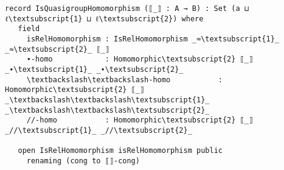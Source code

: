 \begin{Verbatim}[commandchars=\\\{\},samepage=true]
record IsQuasigroupHomomorphism (⟦_⟧ : A → B) : Set (a ⊔ ℓ\textsubscript{1} ⊔ ℓ\textsubscript{2}) where
   field
     isRelHomomorphism : IsRelHomomorphism _≈\textsubscript{1}_ _≈\textsubscript{2}_ ⟦_⟧
     ∙-homo            : Homomorphic\textsubscript{2} ⟦_⟧ _∙\textsubscript{1}_ _∙\textsubscript{2}_
     \textbackslash\textbackslash-homo           : Homomorphic\textsubscript{2} ⟦_⟧ _\textbackslash\textbackslash\textsubscript{1}_ _\textbackslash\textbackslash\textsubscript{2}_
     //-homo           : Homomorphic\textsubscript{2} ⟦_⟧ _//\textsubscript{1}_ _//\textsubscript{2}_

   open IsRelHomomorphism isRelHomomorphism public
     renaming (cong to ⟦⟧-cong)
\end{Verbatim}
\begin{comment}
    ∙-isMagmaHomomorphism : ∙.IsMagmaHomomorphism ⟦_⟧
    ∙-isMagmaHomomorphism = record
      \{ isRelHomomorphism = isRelHomomorphism
      ; homo = ∙-homo
      \}

    \textbackslash\textbackslash-isMagmaHomomorphism : \textbackslash\textbackslash.IsMagmaHomomorphism ⟦_⟧
    \textbackslash\textbackslash-isMagmaHomomorphism = record
      \{ isRelHomomorphism  = isRelHomomorphism
      ; homo = \textbackslash\textbackslash-homo
      \}

    //-isMagmaHomomorphism : //.IsMagmaHomomorphism ⟦_⟧
    //-isMagmaHomomorphism = record
      \{ isRelHomomorphism  = isRelHomomorphism
      ; homo = //-homo
      \}
\end{comment}

